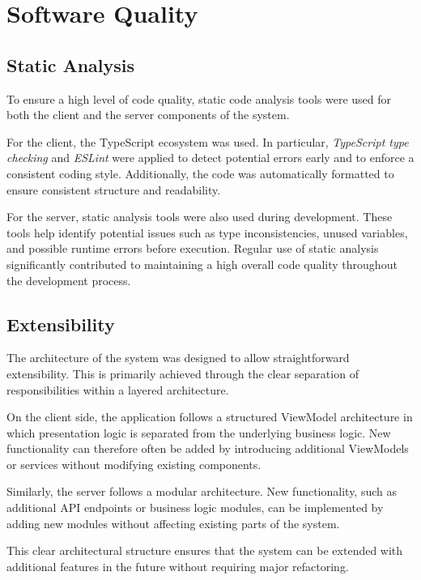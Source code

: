 
\chapter{Software Quality}

\section{Static Analysis}

To ensure a high level of code quality, static code analysis tools were used
for both the client and the server components of the system.

For the client, the TypeScript ecosystem was used. In particular,
\textit{TypeScript type checking} and \textit{ESLint} were applied to detect
potential errors early and to enforce a consistent coding style.
Additionally, the code was automatically formatted to ensure consistent
structure and readability.

For the server, static analysis tools were also used during development.
These tools help identify potential issues such as type inconsistencies,
unused variables, and possible runtime errors before execution.
Regular use of static analysis significantly contributed to maintaining
a high overall code quality throughout the development process.

\section{Extensibility}

The architecture of the system was designed to allow straightforward
extensibility. This is primarily achieved through the clear separation
of responsibilities within a layered architecture.

On the client side, the application follows a structured ViewModel
architecture in which presentation logic is separated from the
underlying business logic. New functionality can therefore often be
added by introducing additional ViewModels or services without
modifying existing components.

Similarly, the server follows a modular architecture. New functionality,
such as additional API endpoints or business logic modules, can be
implemented by adding new modules without affecting existing parts of
the system.

This clear architectural structure ensures that the system can be
extended with additional features in the future without requiring
major refactoring.

